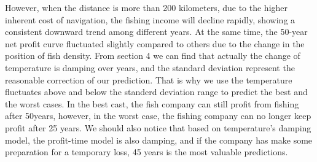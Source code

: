 \documentclass{mcmthesis}
\begin{document}
\begin{figure}[htbp]
    \quad
    \centering
  \end{figure}
  However, when the distance is more than 200 kilometers, due to the higher inherent cost of navigation, the fishing income will decline rapidly, showing a consistent downward trend among different years. At the same time, the 50-year net profit  curve fluctuated slightly compared to others due to the change in the position of fish density.
  From section 4 we can find that actually the change of temperature is damping over years, and the standard deviation represent the reasonable correction of our prediction. That is why we use the temperature fluctuates above and below the standerd deviation range to predict the best and the worst cases. In the best cast, the fish company can still profit from fishing after 50years, however, in the worst case, the fishing company can no longer keep profit after 25 years. We should also notice that based on temperature's damping model, the profit-time model is also damping, and if the company has make some preparation for a temporary loss, 45 years is the most valuable predictions.
\end{document}
